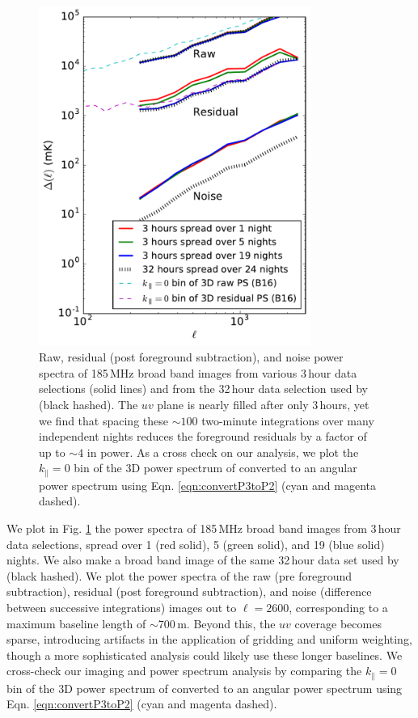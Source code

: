 \documentclass[numberedappendix]{emulateapj}
\begin{document}
\begin{figure}[h]
\centering
\includegraphics[width=3.5in]{res_pspec_of_100_obsids_with_diff_spacings_6amin_delta.pdf}
\caption[Raw, residual (post foreground subtraction), and noise power spectra of 185\,MHz broad band images from various data selections.]{Raw, residual (post foreground subtraction), and noise power spectra of 185\,MHz broad band images from various 3\,hour data selections (solid lines) and from the 32\,hour data selection used by  \citet{beardsley16} (black hashed). The $uv$ plane is nearly filled after only 3\,hours, yet we find that spacing these $\sim100$ two-minute integrations over many independent nights reduces the foreground residuals by a factor of up to $\sim4$ in power. As a cross check on our analysis, we plot the $k_\parallel=0$ bin of the 3D power spectrum of \citet{beardsley16} converted to an angular power spectrum using Eqn. \ref{eqn:convertP3toP2} (cyan and magenta dashed).}
\label{fig:respspecspacingsstudy}
\end{figure}

We plot in Fig. \ref{fig:respspecspacingsstudy} the power spectra of 185\,MHz broad band images from  3\,hour data selections, spread over 1 (red solid), 5 (green solid), and 19 (blue solid) nights. We also make a broad band image of the same 32\,hour data set used by \citet{beardsley16} (black hashed). We plot the power spectra of the raw (pre foreground subtraction), residual (post foreground subtraction), and noise (difference between successive integrations) images out to $\ell=2600$, corresponding to a maximum baseline length of $\sim$700\,m. Beyond this, the $uv$ coverage becomes sparse, introducing artifacts in the application of gridding and uniform weighting, though a more sophisticated analysis could likely use these longer baselines. We cross-check our imaging and power spectrum analysis by comparing the  $k_\parallel=0$ bin of the 3D power spectrum of \citet{beardsley16} converted to an angular power spectrum using Eqn. \ref{eqn:convertP3toP2} (cyan and magenta dashed). 
\end{document}
